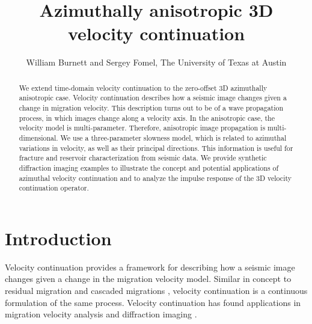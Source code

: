 
\title{Azimuthally anisotropic 3D velocity continuation}


\renewcommand{\thefootnote}{\fnsymbol{footnote}} 

\author{William Burnett and Sergey Fomel, The University of Texas at Austin}

\maketitle

\begin{abstract}
We extend time-domain velocity continuation to the zero-offset 3D azimuthally anisotropic case.  
Velocity continuation describes how a seismic image changes given a change in migration velocity.  
This description turns out to be of a wave propagation process, in which images change along a velocity axis.  
In the anisotropic case, the velocity model is multi-parameter. 
Therefore, anisotropic image propagation is multi-dimensional.  
We use a three-parameter slowness model, which is related to azimuthal variations in velocity, as well as their principal directions.  
This information is useful for fracture and reservoir characterization from seismic data.  
We provide synthetic diffraction imaging examples to illustrate the concept and potential applications of azimuthal velocity continuation and to analyze the impulse response of the 3D velocity continuation operator.
\end{abstract}

\section{Introduction}

Velocity continuation \cite{fomel94, GEO68-05-16501661} provides a framework for describing how a seismic image changes given a change in the migration velocity model.  
Similar in concept to residual migration \cite[]{GEO50-01-01100126} and cascaded migrations \cite[]{GEO52-05-06180643}, velocity continuation is a continuous formulation of the same process.  
Velocity continuation has found applications in migration velocity analysis \cite[]{GEO68-05-16621672, schleicher_etal08a} and diffraction imaging \cite[]{novais_etal06, fomel_landa_taner07}.


